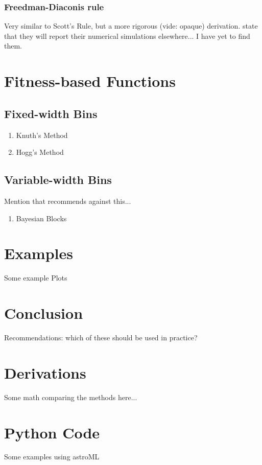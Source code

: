 \documentclass[12pt]{article}
\begin{document}
\subsubsection{Freedman-Diaconis rule}
\citep{Freedman1981}
Very similar to Scott's Rule, but a more rigorous (vide: opaque) derivation.
\citet{Freedman1981} state that they will report their numerical simulations
elsewhere... I have yet to find them.

\section{Fitness-based Functions}

\subsection{Fixed-width Bins}
\begin{enumerate}
\item Knuth's Method \citep{Knuth2006}
\item Hogg's Method \citep{Hogg2008}
\end{enumerate}

\subsection{Variable-width Bins}
Mention that \citet{Birge2003} recommends against this...
\begin{enumerate}
\item Bayesian Blocks \citep{Scargle2012}
\end{enumerate}

\section{Examples}
Some example Plots

\section{Conclusion}
Recommendations: which of these should be used in practice?



\begin{appendix}
\section{Derivations}

Some math comparing the methods here...


\section{Python Code}
Some examples using astroML


\end{appendix}
\end{document}
